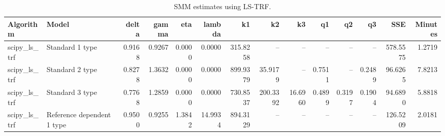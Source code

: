\begin{table}
\caption{SMM estimates using LS-TRF.}
\label{tab:lstrf_estimates}
\begin{tabular}{llrrrrrrrrrrrr}
\toprule
Algorithm & Model & delta & gamma & eta & lambda & k1 & k2 & k3 & q1 & q2 & q3 & SSE & Minutes \\
\midrule
scipy_ls_trf & Standard 1 type & 0.9168 & 0.9267 & 0.0000 & 0.0000 & 315.8258 & -- & -- & -- & -- & -- & 578.5575 & 1.2719 \\
scipy_ls_trf & Standard 2 type & 0.8278 & 1.3632 & 0.0000 & 0.0000 & 899.9379 & 35.9179 & -- & 0.7511 & -- & 0.2489 & 96.6265 & 7.8213 \\
scipy_ls_trf & Standard 3 type & 0.7768 & 1.2859 & 0.0000 & 0.0000 & 730.8537 & 200.3392 & 16.6960 & 0.4899 & 0.3197 & 0.1904 & 94.6890 & 5.8818 \\
scipy_ls_trf & Reference dependent 1 type & 0.9500 & 0.9255 & 1.3842 & 14.9934 & 894.3129 & -- & -- & -- & -- & -- & 126.5209 & 2.0181 \\
\bottomrule
\end{tabular}
\end{table}
